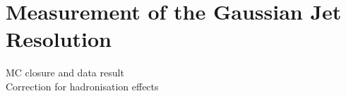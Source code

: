 \section{Measurement of the Gaussian Jet \pt Resolution}
MC closure and data result\\
Correction for hadronisation effects